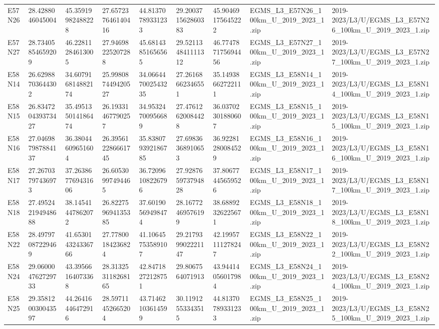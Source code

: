 \begin{landscape}
\begin{longtable}{lllllllll}
E57N26 & 28.4288046045004 & 45.35919982488228 & 27.657237646140416 & 44.81370789331233 & 29.200371562860383 & 45.90469175645222 & EGMS\_L3\_E57N26\_100km\_U\_2019\_2023\_1.zip & 2019-2023/L3/U/EGMS\_L3\_E57N26\_100km\_U\_2019\_2023\_1.zip \\
E57N27 & 28.73405854659209 & 46.22811284613005 & 27.94698225207288 & 45.68143851656565 & 29.521134841111312 & 46.774787175694456 & EGMS\_L3\_E57N27\_100km\_U\_2019\_2023\_1.zip & 2019-2023/L3/U/EGMS\_L3\_E57N27\_100km\_U\_2019\_2023\_1.zip \\
E58N14 & 26.62988703644302 & 34.607916814882174 & 25.998087449420527 & 34.066447002543235 & 27.26168662346551 & 35.14938662722111 & EGMS\_L3\_E58N14\_100km\_U\_2019\_2023\_1.zip & 2019-2023/L3/U/EGMS\_L3\_E58N14\_100km\_U\_2019\_2023\_1.zip \\
E58N15 & 26.834720439373427 & 35.495135014186474 & 26.19331467790257 & 34.95324700956689 & 27.47612620084428 & 36.03702301880607 & EGMS\_L3\_E58N15\_100km\_U\_2019\_2023\_1.zip & 2019-2023/L3/U/EGMS\_L3\_E58N15\_100km\_U\_2019\_2023\_1.zip \\
E58N16 & 27.046987987884137 & 36.38044609651604 & 26.395612286661745 & 35.838079392186785 & 27.69836368910653 & 36.92281280084529 & EGMS\_L3\_E58N16\_100km\_U\_2019\_2023\_1.zip & 2019-2023/L3/U/EGMS\_L3\_E58N16\_100km\_U\_2019\_2023\_1.zip \\
E58N17 & 27.26703797436973 & 37.263867769431606 & 26.60530997494465 & 36.72096108226796 & 27.928765973794828 & 37.80677445659526 & EGMS\_L3\_E58N17\_100km\_U\_2019\_2023\_1.zip & 2019-2023/L3/U/EGMS\_L3\_E58N17\_100km\_U\_2019\_2023\_1.zip \\
E58N18 & 27.495242194948688 & 38.14541447862072 & 26.822759694135385 & 37.60190569498474 & 28.16772469576199 & 38.68892326225671 & EGMS\_L3\_E58N18\_100km\_U\_2019\_2023\_1.zip & 2019-2023/L3/U/EGMS\_L3\_E58N18\_100km\_U\_2019\_2023\_1.zip \\
E58N22 & 28.49797087229469 & 41.653014324336766 & 27.77800184236824 & 41.10645753589107 & 29.217939902221147 & 42.19957111278247 & EGMS\_L3\_E58N22\_100km\_U\_2019\_2023\_1.zip & 2019-2023/L3/U/EGMS\_L3\_E58N22\_100km\_U\_2019\_2023\_1.zip \\
E58N24 & 29.060004762729733 & 43.39566164073368 & 28.313253118268165 & 42.84718272128751 & 29.8067564071913 & 43.94414056017984 & EGMS\_L3\_E58N24\_100km\_U\_2019\_2023\_1.zip & 2019-2023/L3/U/EGMS\_L3\_E58N24\_100km\_U\_2019\_2023\_1.zip \\
E58N25 & 29.358120030043597 & 44.26416446472916 & 28.59711452665204 & 43.71462103614599 & 30.11912553343515 & 44.81370789331233 & EGMS\_L3\_E58N25\_100km\_U\_2019\_2023\_1.zip & 2019-2023/L3/U/EGMS\_L3\_E58N25\_100km\_U\_2019\_2023\_1.zip \\

\end{longtable}
\end{landscape}
